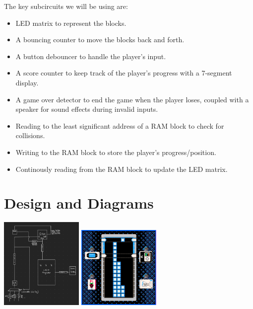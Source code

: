 \documentclass{article}
\begin{document}
    The key subcircuits we will be using are:
    \begin{itemize}
        \item LED matrix to represent the blocks.
        \item A bouncing counter to move the blocks back and forth.
        \item A button debouncer to handle the player's input.
        \item A score counter to keep track of the player's progress with a 7-segment display.
        \item A game over detector to end the game when the player loses, coupled with a speaker for sound effects during invalid inputs.
        \item Reading to the least significant address of a RAM block to check for collisions.
        \item Writing to the RAM block to store the player's progress/position.
        \item Continously reading from the RAM block to update the LED matrix.
    \end{itemize}

    \section{Design and Diagrams}
    \includegraphics[width=0.3\textwidth]{Diagram.png}
    \includegraphics[width=0.3\textwidth]{Stacker.png}
    
\end{document}
